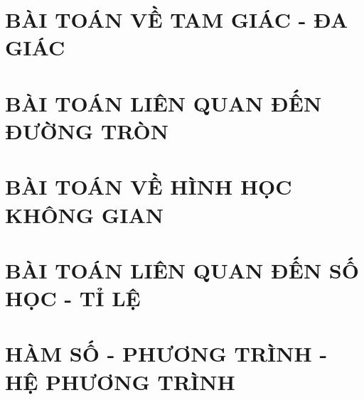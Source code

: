 \documentclass[12pt,a4paper]{extbook}
\begin{document}


\tableofcontents

\section{BÀI TOÁN VỀ TAM GIÁC - ĐA GIÁC}



\section{BÀI TOÁN LIÊN QUAN ĐẾN ĐƯỜNG TRÒN}


\section{BÀI TOÁN VỀ HÌNH HỌC KHÔNG GIAN}



\section{BÀI TOÁN LIÊN QUAN ĐẾN SỐ HỌC - TỈ LỆ}


\section{HÀM SỐ - PHƯƠNG TRÌNH - HỆ PHƯƠNG TRÌNH}






\end{document}

